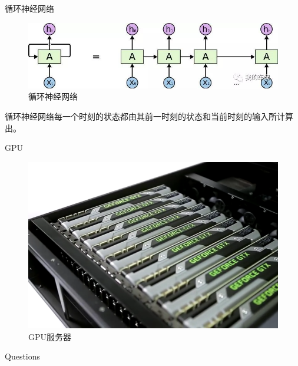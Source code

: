 \documentclass[presentation]{beamer}
\begin{document}
\begin{frame}{循环神经网络}
    \begin{figure}
        \centering
          \includegraphics[width=0.8\linewidth]{2_3.jpg}
          \caption{循环神经网络}
    \end{figure}
    循环神经网络每一个时刻的状态都由其前一时刻的状态和当前时刻的输入所计算出。
\end{frame}

\begin{frame}{GPU}
    \begin{figure}
        \centering
          \includegraphics[width=0.8\linewidth]{2_4.png}
          \caption{GPU服务器}
    \end{figure}
\end{frame}

\begin{frame}[standout]
    Questions
\end{frame}
\end{document}
